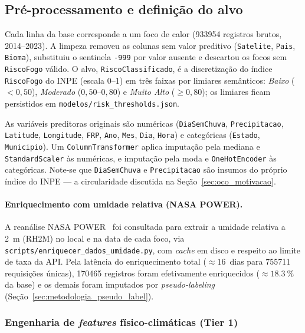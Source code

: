 \subsection{Pré-processamento e definição do alvo}
\label{sec:metodologia_pre_processamento}

Cada linha da base corresponde a um foco de calor (\num{933954} registros brutos, 2014--2023). A limpeza removeu as colunas sem valor preditivo (\texttt{Satelite}, \texttt{Pais}, \texttt{Bioma}), substituiu o sentinela \texttt{-999} por valor ausente e descartou os focos sem \texttt{RiscoFogo} válido. O alvo, \texttt{RiscoClassificado}, é a discretização do índice \texttt{RiscoFogo} do INPE (escala 0--1) em três faixas por limiares semânticos: \emph{Baixo} (\(< 0{,}50\)), \emph{Moderado} (\(0{,}50\)--\(0{,}80\)) e \emph{Muito Alto} (\(\geq 0{,}80\)); os limiares ficam persistidos em \texttt{modelos/risk\_thresholds.json}.

As variáveis preditoras originais são numéricas (\texttt{DiaSemChuva}, \texttt{Precipitacao}, \texttt{Latitude}, \texttt{Longitude}, \texttt{FRP}, \texttt{Ano}, \texttt{Mes}, \texttt{Dia}, \texttt{Hora}) e categóricas (\texttt{Estado}, \texttt{Municipio}). Um \texttt{ColumnTransformer} aplica imputação pela mediana e \texttt{StandardScaler} às numéricas, e imputação pela moda e \texttt{OneHotEncoder} às categóricas. Note-se que \texttt{DiaSemChuva} e \texttt{Precipitacao} são insumos do próprio índice do INPE --- a circularidade discutida na Seção~\ref{sec:oco_motivacao}.

\paragraph{Enriquecimento com umidade relativa (NASA POWER).}
\label{subsec:metod_apis_externas}
A reanálise NASA POWER~\cite{nasapower} foi consultada para extrair a umidade relativa a \SI{2}{m} (RH2M) no local e na data de cada foco, via \texttt{scripts/enriquecer\_dados\_umidade.py}, com \emph{cache} em disco e respeito ao limite de taxa da API. Pela latência do enriquecimento total (\(\approx 16\)~dias para \num{755711} requisições únicas), \num{170465} registros foram efetivamente enriquecidos (\(\approx \SI{18,3}{\percent}\) da base) e os demais foram imputados por \emph{pseudo-labeling} (Seção~\ref{sec:metodologia_pseudo_label}).

\subsubsection{Engenharia de \emph{features} físico-climáticas (Tier 1)}
\label{subsec:metod_features_tier1}

